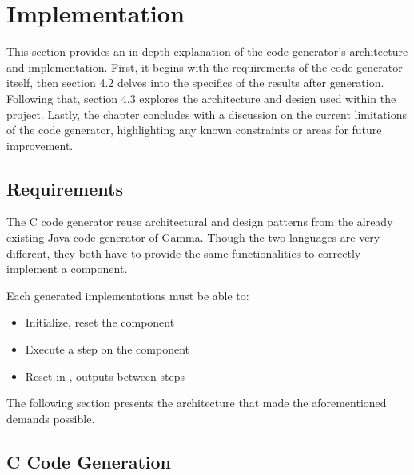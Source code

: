 \chapter{Implementation}

This section provides an in-depth explanation of the code generator's architecture and implementation. First, it begins with the requirements of the code generator itself, then section 4.2 delves into the specifics of the results after generation. Following that, section 4.3 explores the architecture and design used within the project. Lastly, the chapter concludes with a discussion on the current limitations of the code generator, highlighting any known constraints or areas for future improvement.

\section{Requirements}

The C code generator reuse architectural and design patterns from
the already existing Java code generator of Gamma. Though the two languages are very different, they both have to provide the same functionalities to correctly implement a component.

Each generated implementations must be able to:
\begin{itemize}
	\item Initialize, reset the component
	\item Execute a step on the component
	\item Reset in-, outputs between steps
\end{itemize}

The following section presents the architecture that made the aforementioned demands possible. 

\section{C Code Generation}

